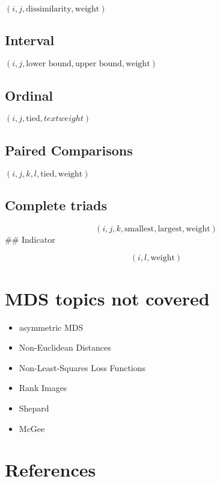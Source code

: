 \documentclass[
  12pt,
  letterpaper,
  DIV=11,
  numbers=noendperiod]{scrartcl}
\providecommand{\tightlist}{%
  \setlength{\itemsep}{0pt}\setlength{\parskip}{0pt}}\usepackage{longtable,booktabs,array}
\begin{document}
\((i, j, \text{dissimilarity}, \text{weight})\)

\subsection{Interval}\label{interval}

\((i, j, \text{lower bound}, \text{upper bound}, \text{weight})\)

\subsection{Ordinal}\label{ordinal}

\((i, j, \text{tied}, text{weight})\)

\subsection{Paired Comparisons}\label{paired-comparisons}

\((i, j, k, l, \text{tied}, \text{weight})\)

\subsection{Complete triads}\label{complete-triads}

\[(i, j, k, \text{smallest}, \text{largest}, \text{weight})\] \#\#
Indicator

\[(i, l, \text{weight})\]

\section{MDS topics not covered}\label{mds-topics-not-covered}

\begin{itemize}
\tightlist
\item
  asymmetric MDS
\item
  Non-Euclidean Distances
\item
  Non-Least-Squares Loss Functions
\item
  Rank Images
\item
  Shepard
\item
  McGee
\end{itemize}

\section*{References}\label{references}
\end{document}

